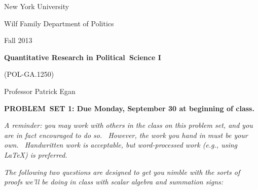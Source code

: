 \documentclass[11pt]{article}
\begin{document}
New York University

Wilf Family Department of Politics

Fall 2013

\begin{center}
{\large \textbf{Quantitative Research in Political\ Science I}}

(POL-GA.1250)

Professor Patrick Egan

\bigskip

\textbf{PROBLEM\ SET 1: Due Monday, September 30 at beginning of class.}
\end{center}

\textit{A reminder: you may work with others in the class on this problem
set, and you are in fact encouraged to do so. \ However, the work you hand
in must be your own. \ Handwritten work is acceptable, but word-processed
work (e.g., using LaTeX) is preferred.}\bigskip 

\bigskip \textit{The following two questions are designed to get you nimble
with the sorts of proofs we'll be doing in class with scalar algebra and
summation signs:}
\end{document}
